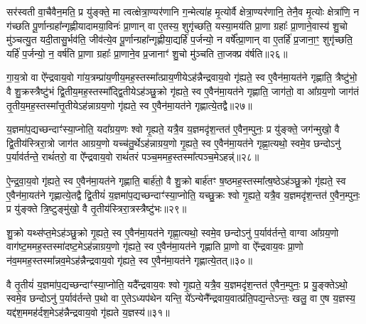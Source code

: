 सर॑स्वती वा॒चैवैन॒मति॒ प्र यु॑ङ्क्ते॒ मा त्वत्क्षेत्रा॒ण्यर॑णानि ग॒न्मेत्या॑ह मृ॒त्योर्वै क्षेत्रा॒ण्यर॑णानि॒ तेनै॒व मृ॒त्योः क्षेत्रा॑णि॒ न ग॑च्छति पू॒र्णान्ग्रहा᳚न्गृह्णीयादामया॒विनः॑ प्रा॒णान् वा ए॒तस्य॒ शुगृ॑च्छति॒ यस्या॒मय॑ति प्रा॒णा ग्रहाः᳚ प्रा॒णाने॒वास्य॑ शु॒चो मु॑ञ्चत्यु॒त यदी॒तासु॒र्भव॑ति॒ जीव॑त्ये॒व पू॒र्णान्ग्रहा᳚न्गृह्णीया॒द्यर्\mbox{}हि॑ प॒र्जन्यो॒ न वर्\mbox{}षे᳚त्प्रा॒णान् वा ए॒तर्\mbox{}हि॑ प्र॒जाना॒ꣳ॒ शुगृ॑च्छति॒ यर्\mbox{}हि॑ प॒र्जन्यो॒ न॒ वर्\mbox{}ष॑ति प्रा॒णा ग्रहाः᳚ प्रा॒णाने॒व प्र॒जानाꣳ॑ शु॒चो मु॑ञ्चति ता॒जक्प्र व॑र्\mbox{}षति॥२६॥

{\anuvakamend[{प्र॒मीये॑त मनु॒ष्य॑ ऋध्यते॒ यस्य॑ पि॒ता पि॑ताम॒हः पुण्यो॒ वाग्वा ए॒व पू॒र्णान्ग्रहा॒न्पञ्च॑विꣳशतिश्च॥७॥}]}

गा॒य॒त्रो वा ऐ᳚न्द्रवाय॒वो गा॑य॒त्रम्प्रा॑य॒णीय॒मह॒स्तस्मा᳚त्प्राय॒णीये\-ऽह॑न्नैन्द्रवाय॒वो गृ॑ह्यते॒ स्व ए॒वैन॑मा॒यत॑ने गृह्णाति॒ त्रैष्टु॑भो॒ वै शु॒क्रस्त्रैष्टु॑भं द्वि॒तीय॒मह॒स्तस्मा᳚द्द्वि॒तीये\-ऽह॑ञ्छु॒क्रो गृ॑ह्यते॒ स्व ए॒वैन॑मा॒यत॑ने गृह्णाति॒ जाग॑तो॒ वा आ᳚ग्रय॒णो जाग॑तं तृ॒तीय॒मह॒स्तस्मा᳚त्तृ॒तीये\-ऽह॑न्नाग्रय॒णो गृ॑ह्यते॒ स्व ए॒वैन॑मा॒यत॑ने गृह्णात्ये॒तद्वै॥२७॥

य॒ज्ञमा॑प॒द्यच्छन्दाꣳ॑स्या॒प्नोति॒ यदा᳚ग्रय॒णः श्वो गृ॒ह्यते॒ यत्रै॒व य॒ज्ञमदृ॑श॒न्तत॑ ए॒वैन॒म्पुनः॒ प्र यु॑ङ्क्ते॒ जग॑न्मुखो॒ वै द्वि॒तीय॑स्त्रिरा॒त्रो जाग॑त आग्रय॒णो यच्च॑तु॒र्थे\-ऽह॑न्नाग्रय॒णो गृ॒ह्यते॒ स्व ए॒वैन॑मा॒यत॑ने गृह्णा॒त्यथो॒ स्वमे॒व छन्दो\-ऽनु॑ प॒र्याव॑र्तन्ते॒ राथं॑तरो॒ वा ऐ᳚न्द्रवाय॒वो राथं॑तरं पञ्च॒ममह॒स्तस्मा᳚त्पञ्च॒मे\-ऽहन्न्॑॥२८॥

ऐ॒न्द्र॒वा॒य॒वो गृ॑ह्यते॒ स्व ए॒वैन॑मा॒यत॑ने गृह्णाति॒ बार्\mbox{}ह॑तो॒ वै शु॒क्रो बार्\mbox{}ह॑तꣳ ष॒ष्ठमह॒स्तस्मा᳚त्ष॒ष्ठे\-ऽह॑ञ्छु॒क्रो गृ॑ह्यते॒ स्व ए॒वैन॑मा॒यत॑ने गृह्णात्ये॒तद्वै द्वि॒तीयं॑ य॒ज्ञमा॑प॒द्यच्छन्दाꣳ॑स्या॒प्नोति॒ यच्छु॒क्रः श्वो गृ॒ह्यते॒ यत्रै॒व य॒ज्ञमदृ॑श॒न्तत॑ ए॒वैन॒म्पुनः॒ प्र यु॑ङ्क्ते त्रि॒ष्टुङ्मु॑खो॒ वै तृ॒तीय॑स्त्रिरा॒त्रस्त्रैष्टु॑भः॥२९॥

शु॒क्रो यथ्स॑प्त॒मे\-ऽह॑ञ्छु॒क्रो गृ॒ह्यते॒ स्व ए॒वैन॑मा॒यत॑ने गृह्णा॒त्यथो॒ स्वमे॒व छन्दो\-ऽनु॑ प॒र्याव॑र्तन्ते॒ वाग्वा आ᳚ग्रय॒णो वाग॑ष्ट॒ममह॒स्तस्मा॑दष्ट॒मे\-ऽह॑न्नाग्रय॒णो गृ॑ह्यते॒ स्व ए॒वैन॑मा॒यत॑ने गृह्णाति प्रा॒णो वा ऐ᳚न्द्रवाय॒वः प्रा॒णो न॑व॒ममह॒स्तस्मा᳚न्नव॒मे\-ऽह॑न्नैन्द्रवाय॒वो गृ॑ह्यते॒ स्व ए॒वैन॑मा॒यत॑ने गृह्णात्ये॒तत्॥३०॥

वै तृ॒तीयं॑ य॒ज्ञमा॑प॒द्यच्छन्दाꣳ॑स्या॒प्नोति॒ यदै᳚न्द्रवाय॒वः श्वो गृ॒ह्यते॒ यत्रै॒व य॒ज्ञमदृ॑श॒न्तत॑ ए॒वैन॒म्पुनः॒ प्र यु॒ङ्क्ते\-ऽथो॒ स्वमे॒व छन्दो\-ऽनु॑ प॒र्याव॑र्तन्ते प॒थो वा ए॒ते\-ऽध्यप॑थेन यन्ति॒ ये᳚\-ऽन्येनै᳚न्द्रवाय॒वात्प्र॑ति॒पद्य॒न्ते\-ऽन्तः॒ खलु॒ वा ए॒ष य॒ज्ञस्य॒ यद्द॑श॒ममह॑र्दश॒मे\-ऽह॑न्नैन्द्रवाय॒वो गृ॑ह्यते य॒ज्ञस्य॑॥३१॥

